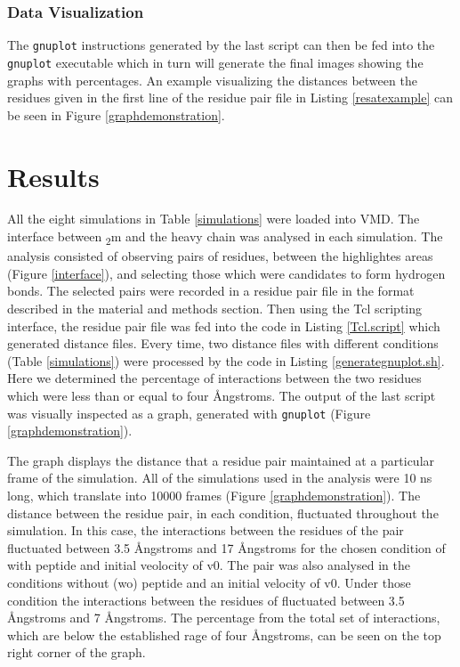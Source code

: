 \documentclass[11pt,twocolumn]{article}
\newcommand{\angstr}{{\AA}ngstroms\xspace}
\newcommand{\btm}{\textbeta\textsubscript{2}m\xspace}
\begin{document}
\subsubsection*{Data Visualization}

The \texttt{gnuplot} instructions generated by the last script can then be fed into the \texttt{gnuplot} executable which in turn will generate the final images showing the graphs with percentages. An example visualizing the distances between the residues given in the first line of the residue pair file in Listing \ref{resatexample} can be seen in Figure \ref{graphdemonstration}.


\section*{Results}

All the eight simulations in Table \ref{simulations} were loaded into VMD. The interface between \btm and the heavy chain was analysed in each simulation. The analysis consisted of observing pairs of residues, between the highlightes areas (Figure \ref{interface}), and selecting those which were candidates to form hydrogen bonds. 
The selected pairs were recorded in a residue pair file in the format described in the material and methods section. Then using the 
Tcl scripting interface, the residue pair file was fed into the code in Listing \ref{Tcl.script} which generated distance files. Every time, two distance files with different conditions (Table \ref{simulations}) were processed by the code in Listing \ref{generategnuplot.sh}. Here we determined the percentage of interactions between the two residues which were less than or equal to four \angstr. The output of the last script  was visually inspected as a graph, generated with \texttt{gnuplot} (Figure \ref{graphdemonstration}).

The graph displays the distance that a residue pair maintained at a particular frame of the simulation. All of the simulations used in the analysis were 10 ns long, which translate into 10000 frames (Figure \ref{graphdemonstration}). The distance between the residue pair, in each condition, fluctuated throughout the simulation. In this case, the interactions between the residues of the pair fluctuated between 3.5 \angstr and  17 \angstr for the chosen condition of with peptide and initial veolocity of v0. The pair was also analysed in the conditions without (wo) peptide and an initial velocity of v0. Under those condition the interactions between the residues of  fluctuated between 3.5 \angstr and  7 \angstr.
The percentage from the total set of interactions, which are below the established rage of four \angstr, can be seen on the top right corner of the graph. 
\end{document}
